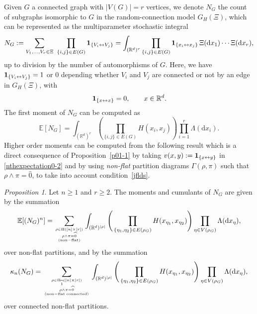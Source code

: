\documentclass[bj,authoryear,noshowframe]{imsart}
\theoremstyle{plain}
\theoremstyle{remark}
\newcommand{\E}{\mathbb{E}}
\newcommand{\R}{\mathbb{R}}
\newcommand{\bone}{{\bf 1}}
\def\real{{\mathord{\mathbb R}}}
\newtheorem{prop}{Proposition}[section]
\begin{document}
 Given $G$ a connected graph with $|V(G)| = r$ vertices,
 we denote $N_G$ the count of subgraphs isomorphic to $G$ in the
 random-connection model $G_H( \Xi )$,
 which can be represented as the multiparameter stochastic integral 
\begin{equation}
\nonumber %
  N_G:=\sum_{V_1,\dots,V_r \in\Xi} \ 
  \prod_{\{i,j\} \in E(G)} 
  \bone_{\{V_i\leftrightarrow V_j\}}
  = \int_{(\real^d)^r}
  \prod_{\{i,j\} \in E(G)} 
  \bone_{\{x_i\leftrightarrow x_j\}}
  \ \! \Xi(\mathrm{d}x_1)\cdots \Xi(\mathrm{d}x_r), 
\end{equation}
up to division by the number of automorphisms of $G$.
 Here, we have $\bone_{\{V_i\leftrightarrow V_j\}}=1$ or $0$ depending
whether $V_i$ and $V_j$ are connected or not by an edge
in $G_H(\Xi)$, with 
\begin{equation}
\label{jflds} 
\bone_{\{x\leftrightarrow x\}}=0, \qquad x\in \real^d. 
\end{equation}
\noindent
 The first moment of $N_G$ can be computed as 
\begin{equation}
\label{fm} 
\E [ N_G ] =\int_{(\R^d)^r}\left(\prod_{\{i,j\}\in E(G)}H(x_i,x_j)\right)\prod_{i=1}^r\Lambda(\mathrm{d}x_i).
\end{equation}
 Higher order moments can be computed from the following result which
is a direct consequence of Proposition~\ref{p01-1}
by taking $v(x,y) : = \bone_{\{x \leftrightarrow y\}}$
in \eqref{nthexpectation0-2} and by using
{\em non-flat} partition diagrams $\Gamma(\rho,\pi )$
 such that $\rho \wedge \pi = \widehat{0}$, 
 to take into account condition~\eqref{jflds}.  
\begin{prop}
 \label{lma-diagram1}
  Let $n \geq 1$ and $r\geq 2$.
  The moments and cumulants of $N_G$ are given by the summation 
\begin{equation} 
\label{nthexpectation-2} 
\E [(N_G)^n] =
\sum_{\rho \in \Pi ( [n] \times [r] )
  \atop {
    \rho \wedge \pi = \widehat{0}
    \atop
        {\rm (non-flat)}
  }
}
\int_{(\R^d )^{|\rho |}}
\Bigg(
\prod_{\{\eta_1,\eta_2\} \in E(\rho_G)}
H(x_{\eta_1},x_{\eta_2})
\Bigg)
\prod_{\eta \in V(\rho_G)}
\Lambda (\mathrm{d}x_\eta ), 
\end{equation} 
 over non-flat partitions, and by the summation   
\begin{equation}
  \label{cumulant-diagram1}
  \kappa_n(N_G)=\sum_{\rho \in \Pi_{\widehat{1}} ( [n] \times [r])
    \atop
    {\rho \wedge \pi = \widehat{0}
    \atop {\rm (non-flat \ \! connected)}}
  }
  \int_{(\R^d )^{|\rho |}}
  \Bigg(
\prod_{\{\eta_1,\eta_2\} \in E(\rho_G)}
H(x_{\eta_1},x_{\eta_2})
\Bigg)
\prod_{\eta \in V(\rho_G)}
\Lambda (\mathrm{d}x_\eta ), 
\end{equation} 
 over connected non-flat partitions. 
\end{prop}
\end{document}
